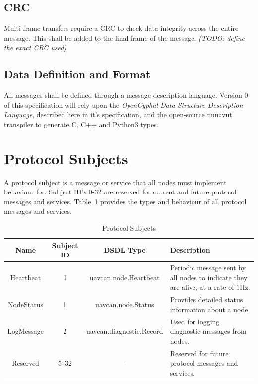 \documentclass[a4paper,12pt]{article}
\begin{document}
\subsection{CRC}
Multi-frame transfers require a CRC to check data-integrity across the entire message. This shall be added to the final frame of the message.
\textit{(TODO: define the exact CRC used)}

\subsection{Data Definition and Format}
All messages shall be defined through a message description language. Version 0 of this specification will rely upon the
\textit{OpenCyphal Data Structure Description Language}, described \href{https://opencyphal.org/specification/Cyphal_Specification.pdf#page=15}{here} 
in it's specification, and the open-source \href{https://github.com/OpenCyphal/nunavut}{nunavut} transpiler to generate C, C++ and Python3 types.
\section{Protocol Subjects}
\label{sec:protocol-subjects}
A protocol subject is a message or service that all nodes must implement behaviour for. Subject ID's 0-32 are reserved for current and future protocol messages and services. Table~\ref{tab:protocol-subjects} provides the types and behaviour of
all protocol messages and services.
\begin{table}[h!]
    \small
    \centering
    \caption{Protocol Subjects}
    \label{tab:protocol-subjects}
    \begin{tabularx}{\textwidth}{|c|c|>{\ttfamily}c|>{\RaggedRight\arraybackslash}X|}
        \hline
        \textbf{Name} & \textbf{Subject ID} & \textbf{DSDL Type} & \textbf{Description} \\
        \hline
        Heartbeat   & 0        & uavcan.node.Heartbeat      & Periodic message sent by all nodes to indicate they are alive, at a rate of 1Hz. \\
        \hline
        NodeStatus  & 1        & uavcan.node.Status         & Provides detailed status information about a node. \\
        \hline
        LogMessage  & 2        & uavcan.diagnostic.Record   & Used for logging diagnostic messages from nodes. \\
        \hline
        Reserved    & 5--32    & -                          & Reserved for future protocol messages and services. \\
        \hline
    \end{tabularx}
\end{table}
\end{document}
